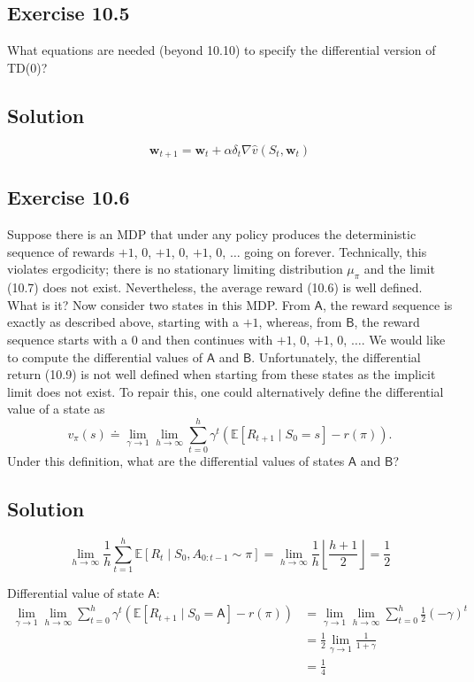\subsection*{Exercise 10.5}
What equations are needed (beyond 10.10) to specify the differential version of TD(0)?

\subsection*{Solution}

\[
    \mathbf{w}_{t+1} = \mathbf{w}_t + \alpha \delta_t \nabla \hat{v}(S_t, \mathbf{w}_t)
\]

\subsection*{Exercise 10.6}

Suppose there is an MDP that under any policy produces the deterministic
sequence of rewards $+1$, $0$, $+1$, $0$, $+1$, $0$, $\dots$ going on forever. Technically, this violates
ergodicity; there is no stationary limiting distribution $\mu_\pi$ and the limit (10.7) does not
exist. Nevertheless, the average reward (10.6) is well defined. What is it? Now consider
two states in this MDP. From $\mathsf{A}$, the reward sequence is exactly as described above,
starting with a $+1$, whereas, from $\mathsf{B}$, the reward sequence starts with a $0$ and then
continues with $+1$, $0$, $+1$, $0$, $\dots$. We would like to compute the differential values of $\mathsf{A}$ and
$\mathsf{B}$. Unfortunately, the differential return (10.9) is not well defined when starting from
these states as the implicit limit does not exist. To repair this, one could alternatively
define the differential value of a state as
\[
    v_\pi(s) \doteq \lim_{\gamma \rightarrow 1} \lim_{h \rightarrow \infty} \sum_{t=0}^{h} \gamma^t \left( \mathbb{E} \left[ R_{t+1} \mid S_0 = s \right] - r(\pi) \right).
\]
Under this definition, what are the differential values of states $\mathsf{A}$ and $\mathsf{B}$?

\subsection*{Solution}
\[
    \lim_{h \rightarrow \infty} \frac{1}{h} \sum_{t=1}^{h} \mathbb{E} \left[ R_{t} \mid S_0, A_{0:t-1} \sim  \pi \right] = \lim_{h \rightarrow \infty} \frac{1}{h}  \left\lfloor \frac{h+1}{2} \right\rfloor = \frac{1}{2}
\]

Differential value of state $\mathsf{A}$:
\begin{align*}
    \lim_{\gamma \rightarrow 1} \lim_{h \rightarrow \infty} \sum_{t=0}^{h} \gamma^t \left( \mathbb{E} \left[ R_{t+1} \mid S_0 = \mathsf{A} \right] - r(\pi) \right) &=  \lim_{\gamma \rightarrow 1} \lim_{h \rightarrow \infty} \sum_{t=0}^{h} \frac{1}{2}\left(-\gamma\right)^t \\
    &= \frac{1}{2}\lim_{\gamma \rightarrow 1} \frac{1}{1 + \gamma} \\
    &= \frac{1}{4}
\end{align*}

